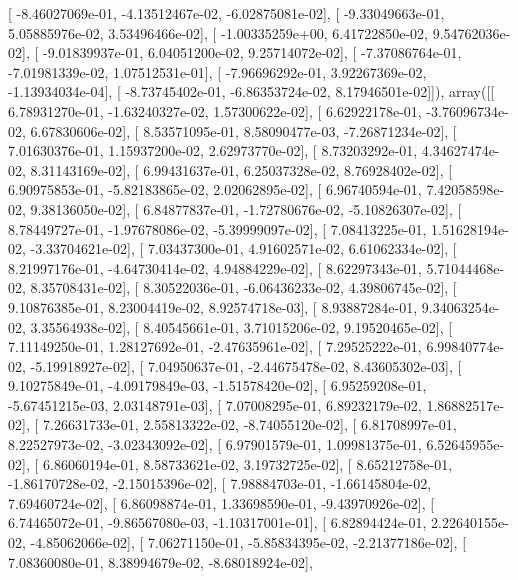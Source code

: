 \documentclass{article}
\begin{document}
       [ -8.46027069e-01,  -4.13512467e-02,  -6.02875081e-02],
       [ -9.33049663e-01,   5.05885976e-02,   3.53496466e-02],
       [ -1.00335259e+00,   6.41722850e-02,   9.54762036e-02],
       [ -9.01839937e-01,   6.04051200e-02,   9.25714072e-02],
       [ -7.37086764e-01,  -7.01981339e-02,   1.07512531e-01],
       [ -7.96696292e-01,   3.92267369e-02,  -1.13934034e-04],
       [ -8.73745402e-01,  -6.86353724e-02,   8.17946501e-02]]), array([[  6.78931270e-01,  -1.63240327e-02,   1.57300622e-02],
       [  6.62922178e-01,  -3.76096734e-02,   6.67830606e-02],
       [  8.53571095e-01,   8.58090477e-03,  -7.26871234e-02],
       [  7.01630376e-01,   1.15937200e-02,   2.62973770e-02],
       [  8.73203292e-01,   4.34627474e-02,   8.31143169e-02],
       [  6.99431637e-01,   6.25037328e-02,   8.76928402e-02],
       [  6.90975853e-01,  -5.82183865e-02,   2.02062895e-02],
       [  6.96740594e-01,   7.42058598e-02,   9.38136050e-02],
       [  6.84877837e-01,  -1.72780676e-02,  -5.10826307e-02],
       [  8.78449727e-01,  -1.97678086e-02,  -5.39999097e-02],
       [  7.08413225e-01,   1.51628194e-02,  -3.33704621e-02],
       [  7.03437300e-01,   4.91602571e-02,   6.61062334e-02],
       [  8.21997176e-01,  -4.64730414e-02,   4.94884229e-02],
       [  8.62297343e-01,   5.71044468e-02,   8.35708431e-02],
       [  8.30522036e-01,  -6.06436233e-02,   4.39806745e-02],
       [  9.10876385e-01,   8.23004419e-02,   8.92574718e-03],
       [  8.93887284e-01,   9.34063254e-02,   3.35564938e-02],
       [  8.40545661e-01,   3.71015206e-02,   9.19520465e-02],
       [  7.11149250e-01,   1.28127692e-01,  -2.47635961e-02],
       [  7.29525222e-01,   6.99840774e-02,  -5.19918927e-02],
       [  7.04950637e-01,  -2.44675478e-02,   8.43605302e-03],
       [  9.10275849e-01,  -4.09179849e-03,  -1.51578420e-02],
       [  6.95259208e-01,  -5.67451215e-03,   2.03148791e-03],
       [  7.07008295e-01,   6.89232179e-02,   1.86882517e-02],
       [  7.26631733e-01,   2.55813322e-02,  -8.74055120e-02],
       [  6.81708997e-01,   8.22527973e-02,  -3.02343092e-02],
       [  6.97901579e-01,   1.09981375e-01,   6.52645955e-02],
       [  6.86060194e-01,   8.58733621e-02,   3.19732725e-02],
       [  8.65212758e-01,  -1.86170728e-02,  -2.15015396e-02],
       [  7.98884703e-01,  -1.66145804e-02,   7.69460724e-02],
       [  6.86098874e-01,   1.33698590e-01,  -9.43970926e-02],
       [  6.74465072e-01,  -9.86567080e-03,  -1.10317001e-01],
       [  6.82894424e-01,   2.22640155e-02,  -4.85062066e-02],
       [  7.06271150e-01,  -5.85834395e-02,  -2.21377186e-02],
       [  7.08360080e-01,   8.38994679e-02,  -8.68018924e-02],
\end{document}
